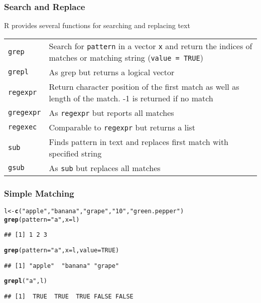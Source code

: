 \documentclass[paper=screen,mathserif]{beamer}\usepackage[]{graphicx}\usepackage[]{color}
\makeatletter
\newcommand{\hlnum}[1]{\textcolor[rgb]{0.686,0.059,0.569}{#1}}%
\newcommand{\hlstr}[1]{\textcolor[rgb]{0.192,0.494,0.8}{#1}}%
\newcommand{\hlstd}[1]{\textcolor[rgb]{0.345,0.345,0.345}{#1}}%
\newcommand{\hlkwb}[1]{\textcolor[rgb]{0.69,0.353,0.396}{#1}}%
\newcommand{\hlkwc}[1]{\textcolor[rgb]{0.333,0.667,0.333}{#1}}%
\newcommand{\hlkwd}[1]{\textcolor[rgb]{0.737,0.353,0.396}{\textbf{#1}}}%
\newenvironment{kframe}{%
 \def\at@end@of@kframe{}%
 \ifinner\ifhmode%
  \def\at@end@of@kframe{\end{minipage}}%
  \begin{minipage}{\columnwidth}%
 \fi\fi%
 \def\FrameCommand##1{\hskip\@totalleftmargin \hskip-\fboxsep
 \colorbox{shadecolor}{##1}\hskip-\fboxsep
     \hskip-\linewidth \hskip-\@totalleftmargin \hskip\columnwidth}%
 \MakeFramed {\advance\hsize-\width
   \@totalleftmargin\z@ \linewidth\hsize
   \@setminipage}}%
 {\par\unskip\endMakeFramed%
 \at@end@of@kframe}
\newenvironment{knitrout}{}{} %
\newcommand{\ft}[1]{\frametitle{#1}}
\newenvironment{xframe}[1][]
{\begin{frame}[fragile,environment=xframe]
    \frametitle{#1}}
  {\end{frame}}
\makeatother
\begin{document}
\begin{xframe}
  \ft{Search and Replace}
  
  R provides several functions for searching and replacing text
  \begin{center}
    {\small
      \begin{tabular}{lp{8cm}} 
        \toprule
        {\tt grep}                 & Search for {\tt pattern} in a
        vector {\tt x} and return the indices of matches or matching
        string ({\tt value = TRUE})       \\[5pt]
        {\tt grepl} & As grep but returns a logical vector \\[5pt]
        {\tt regexpr} & Return character position of the first match
        as well as length of the match. -1 is returned if no match \\[5pt]
        {\tt gregexpr} & As {\tt regexpr} but reports all matches \\[5pt]
        {\tt regexec} & Comparable to {\tt regexpr} but returns a list\\[5pt]
        \midrule
        {\tt sub} & Finds pattern in text and replaces first
        match with specified string \\[5pt]
        {\tt gsub} & As {\tt sub} but replaces all matches\\[5pt]
        \bottomrule
      \end{tabular}}
  \end{center}
\end{xframe}

\begin{xframe}
  \ft{Simple Matching}
  
\begin{knitrout}\scriptsize
{}\color{fgcolor}\begin{kframe}
\begin{alltt}
\hlstd{l} \hlkwb{<-} \hlkwd{c}\hlstd{(}\hlstr{"apple"}\hlstd{,} \hlstr{"banana"}\hlstd{,} \hlstr{"grape"}\hlstd{,} \hlstr{"10"}\hlstd{,} \hlstr{"green.pepper"}\hlstd{)}
\hlkwd{grep}\hlstd{(}\hlkwc{pattern} \hlstd{=} \hlstr{"a"}\hlstd{,} \hlkwc{x} \hlstd{= l)}
\end{alltt}
\begin{verbatim}
## [1] 1 2 3
\end{verbatim}
\begin{alltt}
\hlkwd{grep}\hlstd{(}\hlkwc{pattern} \hlstd{=} \hlstr{"a"}\hlstd{,} \hlkwc{x} \hlstd{= l,} \hlkwc{value} \hlstd{=} \hlnum{TRUE}\hlstd{)}
\end{alltt}
\begin{verbatim}
## [1] "apple"  "banana" "grape"
\end{verbatim}
\begin{alltt}
\hlkwd{grepl}\hlstd{(}\hlstr{"a"}\hlstd{, l)}
\end{alltt}
\begin{verbatim}
## [1]  TRUE  TRUE  TRUE FALSE FALSE
\end{verbatim}
\end{kframe}
\end{knitrout}

\end{xframe}
\end{document}
